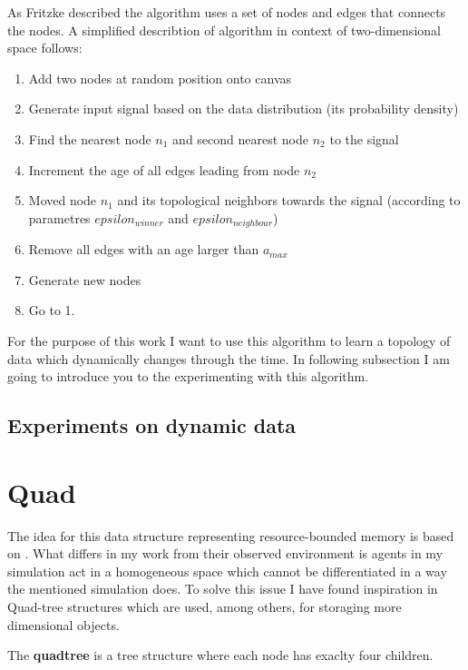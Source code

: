 As Fritzke described the algorithm uses a set of nodes and edges that connects the nodes. A simplified describtion of algorithm in context of two-dimensional space follows:

\begin{enumerate}
\item Add two nodes at random position onto canvas
\item Generate input signal based on the data distribution (its probability density)
\item Find the nearest node $n_1$ and second nearest node $n_2$ to the signal
\item Increment the age of all edges leading from node $n_2$
\item Moved node $n_1$ and its topological neighbors towards the signal (according to parametres $epsilon_{winner}$ and $epsilon_{neighbour}$)
\item Remove all edges with an age larger than $a_{max}$
\item Generate new nodes
\item Go to 1.
\end{enumerate}

For the purpose of this work I want to use this algorithm to learn a topology of data which dynamically changes through the time. In following subsection I am going to introduce you to the experimenting with this algorithm.

\subsection{Experiments on dynamic data}

\section{Quad}

The idea for this data structure representing resource-bounded memory is based on \cite{Brom:placeandobjects}. What differs in my work from their observed environment is agents in my simulation act in a homogeneous space which cannot be differentiated in a way the mentioned simulation does. To solve this issue I have found inspiration in Quad-tree structures \cite{Finkel:quadtrees} which are used, among others, for storaging more dimensional objects.

\begin{definition}The {\bf quadtree} is a tree structure where each node has exaclty four children. 
\end{definition}
                  
